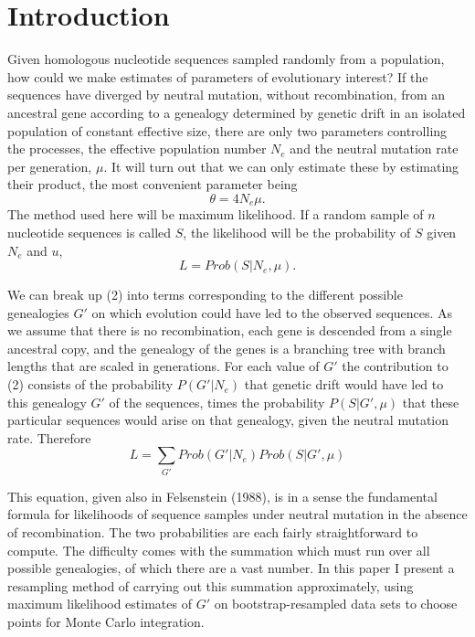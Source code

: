 \section{Introduction}

Given homologous nucleotide sequences sampled randomly from a population, how
could we make estimates of parameters of evolutionary interest?  If the sequences
have diverged by neutral mutation, without recombination, from an ancestral
gene according to a genealogy determined by genetic drift in an isolated
population of constant effective size, there are only two parameters
controlling the processes, the effective population number $N_e$ and the
neutral mutation rate per generation, $\mu$.  It will turn out that we can only estimate these
by estimating their product, the most convenient parameter being 
\begin{equation} %
\theta = 4N_e\mu.
\end{equation}
The method used here will be maximum likelihood.  If a random sample of $n$
nucleotide sequences is called $S$, the likelihood will be the probability
of $S$ given $N_e$ and $u$,
\begin{equation} %
L = Prob(S | N_e, \mu).
\end{equation}

We can break up (2) into terms corresponding to the different possible
genealogies $G'$ on which evolution could have led to the observed
sequences.  As we assume that there is no recombination, each gene is
descended from a single ancestral copy, and the genealogy of the genes
is a branching tree with branch lengths that are scaled in generations.
For each value of $G'$ the contribution to (2) consists of
the probability $P(G' | N_e)$ that genetic drift would have led to this
genealogy $G'$ of the sequences, times the probability $P(S | G', \mu)$
that these particular sequences would arise on that genealogy, given the neutral mutation
rate.  Therefore
\begin{equation} %
L = \sum_{G'} Prob(G' | N_e) Prob(S | G', \mu)
\end{equation}

This equation, given also in Felsenstein (1988), is in a sense the
fundamental formula for likelihoods of sequence samples under neutral
mutation in the absence of recombination.  The two probabilities are
each fairly straightforward to compute.  The difficulty comes with
the summation which must run over all possible genealogies, of which
there are a vast number.  In this paper I present a resampling method of
carrying out this
summation approximately, using maximum likelihood estimates of $G'$ on
bootstrap-resampled data sets to choose points for Monte Carlo integration.


